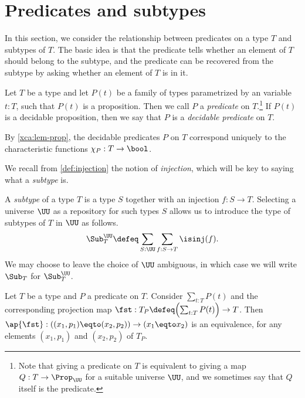 \section{Predicates and subtypes}
\label{sec:subtype}

In this section, we consider the relationship between predicates on a type $T$ and subtypes of $T$.  The basic idea is that the predicate tells
whether an element of $T$ should belong to the subtype, and the predicate can be recovered from the subtype by asking whether an element of $T$
is in it.

\begin{definition}\label{def:predicate}
  Let $T$ be a type and let $P(t)$ be a family of types parametrized by an variable $t:T$, such that $P(t)$ is a proposition.
  Then we call $P$ a \emph{predicate} on $T$.\footnote{%
    Note that giving a predicate on $T$ is
    equivalent to giving a map $Q: T\to\Prop_\UU$ for a suitable universe $\UU$,
    and we sometimes say that $Q$ itself is the predicate.}
  If $P(t)$ is a decidable proposition,
  then we say that $P$ is a \emph{decidable predicate} on $T$.
\end{definition}

By \cref{xca:lem-prop}, the decidable predicates $P$ on $T$
correspond uniquely to the characteristic functions $\chi_P:T\to\bool$.

We recall from \cref{def:injection} the notion of \emph{injection}, 
which will be key to saying what a \emph{subtype} is.


\begin{definition}\label{def:subtype}
  A \emph{subtype} of a type $T$
  is a type $S$ together with an injection
  $f : S \to T$.  Selecting a universe $\UU$ as a repository for such types $S$ allows us to introduce
  the type of subtypes of $T$ in $\UU$ as follows.
  \[
  \Sub^\UU_T \defeq \sum_{S:\UU}\sum_{f:S\to T}\isinj(f).
  \]
  We may choose to leave the choice of $\UU$ ambiguous, in which case we will write $\Sub_T$ for $\Sub^\UU_T$.
\end{definition}

\begin{lemma}\label{lem:subtype-eq-=}
  Let $T$ be a type and $P$ a predicate on $T$.
  Consider $\sum_{t:T}P(t)$ and the corresponding projection map
  $\fst : T_P \defeq \Bigl(\sum_{t:T}P(t)\Bigr) \to T$.
  Then $\ap{\fst}: ((x_1,p_1) \eqto (x_2,p_2)) \to (x_1 \eqto x_2)$ is an equivalence,
  for any elements $(x_1,p_1)$ and $(x_2,p_2)$ of $T_P$.
\end{lemma}

